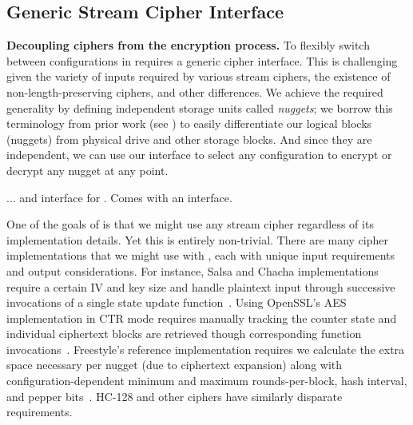\subsection{Generic Stream Cipher Interface}\label{subsec:interface}

\textbf{Decoupling ciphers from the encryption process.} To flexibly switch
between configurations in \sys requires a generic cipher interface. This is
challenging given the variety of inputs required by various stream ciphers, the
existence of non-length-preserving ciphers, and other differences. We achieve
the required generality by defining independent storage units called
\emph{nuggets}; we borrow this terminology from prior work (see
\cite{StrongBox}) to easily differentiate our logical blocks (nuggets) from
physical drive and other storage blocks. And since they are independent, we can
use our interface to select any configuration to encrypt or decrypt any nugget
at any point.

... and interface for \sysB. Comes with an interface.


One of the goals of \sys is that we might use any stream cipher regardless of
its implementation details. Yet this is entirely non-trivial. There are many
cipher implementations that we might use with \sys, each with unique input
requirements and output considerations. For instance, Salsa and Chacha
implementations require a certain IV and key size and handle plaintext input
through successive invocations of a single state update
function~\cite{Floodyberry}. Using OpenSSL's AES implementation in CTR mode
requires manually tracking the counter state and individual ciphertext blocks
are retrieved though corresponding function invocations~\cite{OpenSSL}.
Freestyle's reference implementation requires we calculate the extra space
necessary per nugget (due to ciphertext expansion) along with
configuration-dependent minimum and maximum rounds-per-block, hash interval, and
pepper bits~\cite{Freestyle}. HC-128 and other ciphers have similarly disparate
requirements.


